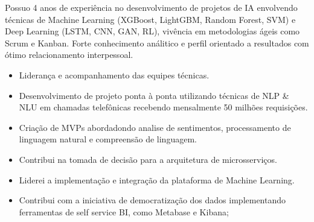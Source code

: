 \documentclass[10pt,a4paper,ragged2e]{altacv}
\begin{document}

\begin{fullwidth}
\makecvheader
\end{fullwidth}




\justifying
Possuo 4 anos de experiência no desenvolvimento de projetos de IA envolvendo 
técnicas de Machine Learning (XGBoost, LightGBM, Random Forest, SVM) e Deep Learning  
(LSTM, CNN, GAN, RL), vivência em metodologias ágeis como Scrum 
e Kanban. Forte conhecimento análitico e perfil orientado a resultados com ótimo 
relacionamento interpessoal. 


\begin{itemize}

\item Liderança e acompanhamento das equipes técnicas.

\item Desenvolvimento de projeto ponta à ponta utilizando técnicas de NLP \& NLU 
      em chamadas telefônicas recebendo mensalmente 50 milhões requisições.

\item Criação de MVPs abordadondo analise de sentimentos, processamento de linguagem 
      natural e compreensão de linguagem. 

\item Contribui na tomada de decisão para a arquitetura de microsserviços.

\item Liderei a implementação e integração da plataforma de Machine Learning.
       
\item Contribui com a iniciativa de democratização dos dados implementando ferramentas
      de self service BI, como Metabase e Kibana;

\end{itemize}
\end{document}
